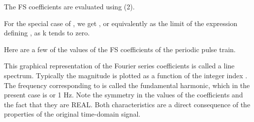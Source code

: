 \documentclass{article}
\begin{document}
\begin{CellGroup}
\begin{CellGroup}
\end{CellGroup}
The FS coefficients are evaluated using (2).

\begin{CellGroup}

\end{CellGroup}
For the special case of , we get , or equivalently as the limit of the expression defining , as k tends to zero. 



\begin{CellGroup}

\end{CellGroup}
Here are a few of the values of the FS coefficients of the periodic pulse train.

\begin{CellGroup}

\end{CellGroup}
This graphical representation of the Fourier series coefficients is called a line spectrum. Typically the magnitude is plotted as a function of the
integer index . The frequency corresponding to  is called the fundamental harmonic, which in the present case
is   or 1 Hz. Note the symmetry in the
values of the coefficients and the fact that they are REAL. Both characteristics are a direct consequence of the properties of the original time-domain
signal.



\begin{CellGroup}



\end{CellGroup}

\end{CellGroup}
\end{document}
